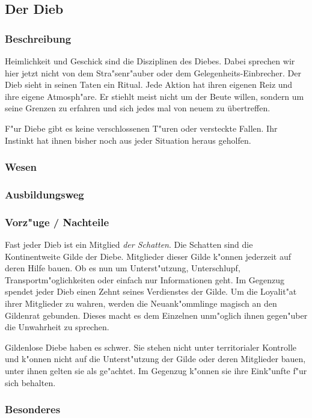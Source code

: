 \subsection{Der Dieb}
\subsubsection{Beschreibung}
\par Heimlichkeit und Geschick sind die Disziplinen des Diebes. Dabei sprechen wir hier jetzt nicht von dem
 Stra"senr"auber oder dem Gelegenheits-Einbrecher. Der Dieb sieht 
 in seinen Taten ein Ritual.
Jede Aktion hat ihren eigenen Reiz und ihre eigene Atmosph"are. Er stiehlt meist nicht um der Beute willen, 
sondern um seine Grenzen zu erfahren und sich jedes mal von neuem zu übertreffen.
\par F"ur Diebe gibt es keine verschlossenen T"uren oder versteckte Fallen. Ihr Instinkt hat ihnen bisher noch
 aus jeder Situation heraus geholfen.
\subsubsection{Wesen}
\subsubsection{Ausbildungsweg}
\subsubsection{Vorz"uge / Nachteile}
\par Fast jeder Dieb ist ein Mitglied \textit{der Schatten}. Die Schatten sind die 
Kontinentweite Gilde der Diebe. Mitglieder dieser Gilde k"onnen jederzeit auf deren Hilfe bauen. Ob es nun 
um Unterst"utzung, Unterschlupf, Transportm"oglichkeiten oder einfach nur Informationen geht. Im Gegenzug 
\glqq spendet\grqq{} jeder Dieb einen Zehnt seines \glqq Verdienstes\grqq{} der Gilde. Um die Loyalit"at 
ihrer Mitglieder zu wahren, werden die Neuank"ommlinge magisch an den Gildenrat gebunden. Dieses macht es 
dem Einzelnen unm"oglich ihnen gegen"uber die Unwahrheit zu sprechen.
\par Gildenlose Diebe haben es schwer. Sie stehen nicht unter territorialer Kontrolle und k"onnen nicht auf 
die Unterst"utzung der Gilde oder deren Mitglieder bauen, unter ihnen gelten sie als ge"achtet. Im Gegenzug 
k"onnen sie ihre Eink"unfte f"ur sich behalten.
\subsubsection{Besonderes}
